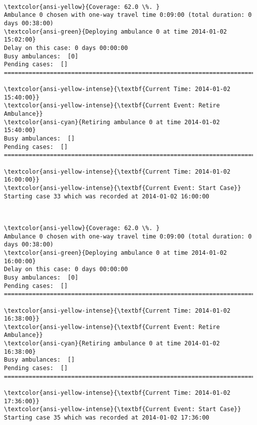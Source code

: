 \documentclass[11pt]{article}
\begin{document}
    \begin{center}
    \end{center}
    { \hspace*{\fill} \\}
    
    \begin{Verbatim}[commandchars=\\\{\}]
\textcolor{ansi-yellow}{Coverage: 62.0 \%. }
Ambulance 0 chosen with one-way travel time 0:09:00 (total duration: 0 days 00:38:00)
\textcolor{ansi-green}{Deploying ambulance 0 at time 2014-01-02 15:02:00}
Delay on this case: 0 days 00:00:00
Busy ambulances:  [0]
Pending cases:  []
========================================================================

\textcolor{ansi-yellow-intense}{\textbf{Current Time: 2014-01-02 15:40:00}}
\textcolor{ansi-yellow-intense}{\textbf{Current Event: Retire Ambulance}}
\textcolor{ansi-cyan}{Retiring ambulance 0 at time 2014-01-02 15:40:00}
Busy ambulances:  []
Pending cases:  []
========================================================================

\textcolor{ansi-yellow-intense}{\textbf{Current Time: 2014-01-02 16:00:00}}
\textcolor{ansi-yellow-intense}{\textbf{Current Event: Start Case}}
Starting case 33 which was recorded at 2014-01-02 16:00:00

    \end{Verbatim}

    \begin{center}
    \end{center}
    { \hspace*{\fill} \\}
    
    \begin{Verbatim}[commandchars=\\\{\}]
\textcolor{ansi-yellow}{Coverage: 62.0 \%. }
Ambulance 0 chosen with one-way travel time 0:09:00 (total duration: 0 days 00:38:00)
\textcolor{ansi-green}{Deploying ambulance 0 at time 2014-01-02 16:00:00}
Delay on this case: 0 days 00:00:00
Busy ambulances:  [0]
Pending cases:  []
========================================================================

\textcolor{ansi-yellow-intense}{\textbf{Current Time: 2014-01-02 16:38:00}}
\textcolor{ansi-yellow-intense}{\textbf{Current Event: Retire Ambulance}}
\textcolor{ansi-cyan}{Retiring ambulance 0 at time 2014-01-02 16:38:00}
Busy ambulances:  []
Pending cases:  []
========================================================================

\textcolor{ansi-yellow-intense}{\textbf{Current Time: 2014-01-02 17:36:00}}
\textcolor{ansi-yellow-intense}{\textbf{Current Event: Start Case}}
Starting case 35 which was recorded at 2014-01-02 17:36:00

    \end{Verbatim}
\end{document}
